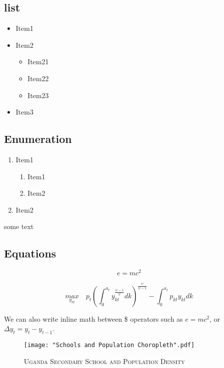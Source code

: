 \documentclass[a4paper, 14pt]{article}
\begin{document}
\subsection{list}

\begin{itemize}%
\item Item1
\item Item2
\begin{itemize}%
\item Item21
\item Item22
\item Item23
\end{itemize}
\item Item3
\end{itemize}

\subsection*{Enumeration} %

\begin{enumerate}%
\item Item1
\begin{enumerate}
\item Item1
\item Item2
\end{enumerate}
\item Item2
\end{enumerate}

some text

\subsection*{Equations} %

\begin{equation} 
e = mc^2
\end{equation}

\begin{equation}
\underset{y_{kt}}{max}\quad p_t\left(\int_0^{a_t}y_{kt}^{\frac{\psi-1}{\psi}}dk\right)^{\frac{\psi}{\psi-1}}-\int_0^{a_t}p_{kt}y_{kt}dk
\end{equation}


We can also write inline math between \$ operators such as $e=mc^2$, or $\Delta y_t = y_t - y_{t-1}$.



\begin{figure}[H]
\centering
\caption{\textsc{Uganda Secondary School and Population Density}}
\label{fig:pl1}
\texttt{[image: "Schools and Population Choropleth".pdf]} %
\end{figure}
\end{document}
